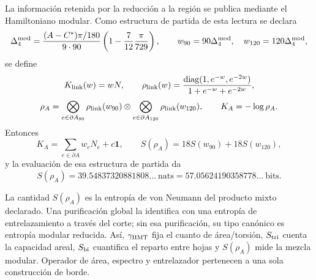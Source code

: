 La información retenida por la reducción a la región se publica mediante el
Hamiltoniano modular. Como estructura de partida de esta lectura se declara
\[
 \Delta_4^{\rm mod}
 =\frac{(A-C^*)\pi/180}{9\cdot90}
 \left(1-\frac7{12}\frac\pi{729}\right),
 \qquad w_{90}=90\Delta_4^{\rm mod},\quad
 w_{120}=120\Delta_4^{\rm mod},
\]
se define
\[
 K_{\rm link}(w)=wN,
 \qquad
 \rho_{\rm link}(w)=
 \frac{\operatorname{diag}(1,e^{-w},e^{-2w})}
 {1+e^{-w}+e^{-2w}},
\]
\begin{equation}
 \rho_A=
 \bigotimes_{e\in\partial A_{90}}\rho_{\rm link}(w_{90})
 \otimes
 \bigotimes_{e\in\partial A_{120}}\rho_{\rm link}(w_{120}),
 \qquad K_A=-\log\rho_A.
 \label{hap:eq:estado-hamiltoniano-modular-barbero-rev11}
\end{equation}
Entonces
\[
 K_A=\sum_{e\in\partial A}w_eN_e+c\mathbf1,
 \qquad
 S(\rho_A)=18S(w_{90})+18S(w_{120}),
\]
y la evaluación de esa estructura de partida da
\[
 S(\rho_A)=39.54837320881808\ldots\ \text{nats}
 =57.05624190358778\ldots\ \text{bits}.
\]

La cantidad \(S(\rho_A)\) es la entropía de von Neumann del producto mixto
declarado. Una purificación global la identifica con una entropía de
entrelazamiento a través del corte; sin esa purificación, su tipo canónico es
entropía modular reducida. Así, \(\gamma_{\rm HMT}\) fija el cuanto de
área/torsión, \(S_{\rm tri}\) cuenta la capacidad areal, \(S_{\rm bi}\)
cuantifica el reparto entre hojas y \(S(\rho_A)\) mide la mezcla modular.
Operador de área, espectro y entrelazador pertenecen a una sola construcción
de borde.
